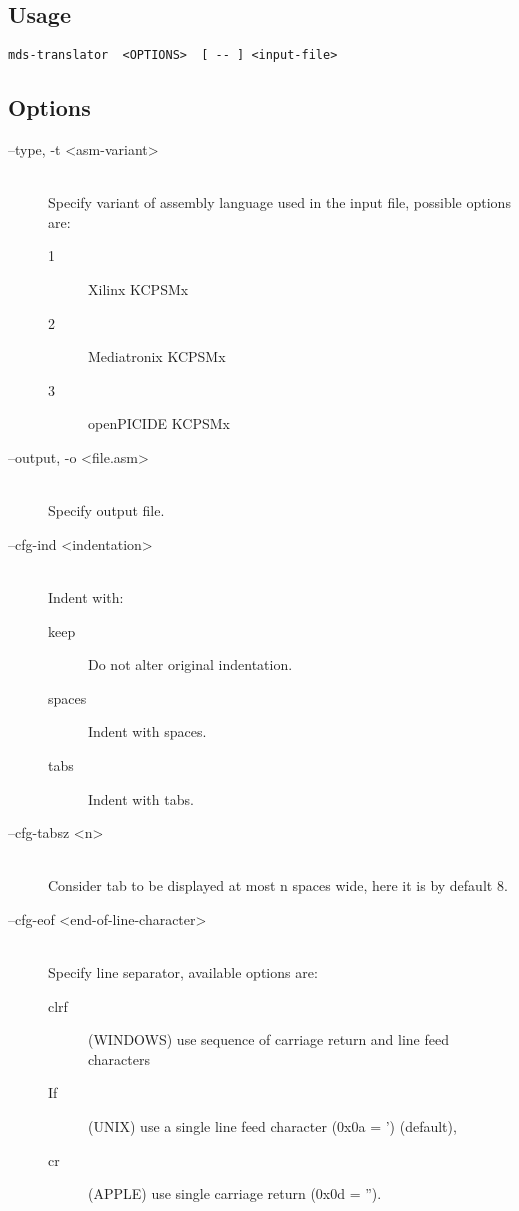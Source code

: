     \subsection{Usage}
        \verb'mds-translator  <OPTIONS>  [ -- ] <input-file>'

    \subsection{Options}
        \begin{description}
            \item[--type, -t <asm-variant>]~\\
                Specify variant of assembly language used in the input file, possible options are:
                \begin{description}
                    \item [1] Xilinx KCPSMx
                    \item [2] Mediatronix KCPSMx
                    \item [3] openPICIDE KCPSMx
                \end{description}

            \item[--output, -o <file.asm>]~\\
                Specify output file.

            \item[--cfg-ind <indentation>]~\\
                Indent with:
                \begin{description}
                    \item [keep] Do not alter original indentation.
                    \item [spaces] Indent with spaces.
                    \item [tabs] Indent with tabs.
                \end{description}

            \item[--cfg-tabsz <n>]~\\
                Consider tab to be displayed at most n spaces wide, here it is by default 8.

            \item[--cfg-eof <end-of-line-character>]~\\
                Specify line separator, available options are:
                \begin{description}
                    \item [clrf] (WINDOWS) use sequence of carriage return and line feed characters
                    \item [If] (UNIX) use a single line feed character (0x0a = ') (default),
                    \item [cr] (APPLE) use single carriage return (0x0d = '').
                \end{description}


\end{description}
